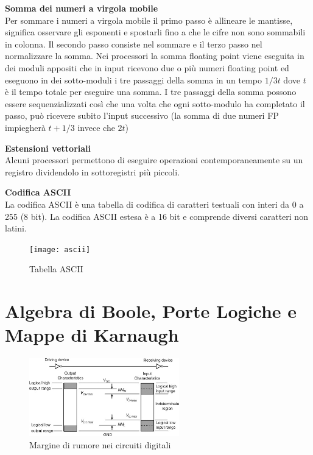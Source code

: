 \begin{defn}
	\textbf{Somma dei numeri a virgola mobile} \\

	Per sommare i numeri a virgola mobile il primo passo è allineare le mantisse, significa osservare gli esponenti e spostarli fino a che le cifre non sono sommabili in colonna.
	Il secondo passo consiste nel sommare e il terzo passo nel normalizzare la somma. Nei processori la somma floating point viene eseguita in dei moduli appositi che in input ricevono due o più numeri floating point ed eseguono in dei sotto-moduli i tre passaggi della somma in un tempo $ 1/3 t $ dove $ t $ è il tempo totale per eseguire una somma. I tre passaggi della somma possono essere sequenzializzati così che una volta che ogni sotto-modulo ha completato il passo, può ricevere subito l'input successivo (la somma di due numeri FP impiegherà $ t + 1/3 $ invece che $ 2t $)
\end{defn}


\begin{defn}
	\textbf{Estensioni vettoriali} \\
	Alcuni processori permettono di eseguire operazioni contemporaneamente su un registro dividendolo in sottoregistri più piccoli.
\end{defn}


\begin{defn}
	\textbf{Codifica ASCII} \\
	La codifica ASCII è una tabella di codifica di caratteri testuali con interi da 0 a 255 (8 bit). La codifica ASCII estesa è a 16 bit e comprende diversi caratteri non latini.
	
	\begin{figure}
		\caption{Tabella ASCII}
		\texttt{[image: ascii]}
	\end{figure}
\end{defn}


\section{Algebra di Boole, Porte Logiche e Mappe di Karnaugh}

\begin{figure}
	\begin{center}
		\includegraphics[width=0.58\textwidth]{noisemargin}
	\end{center}
	\caption{Margine di rumore nei circuiti digitali}	
\end{figure}


